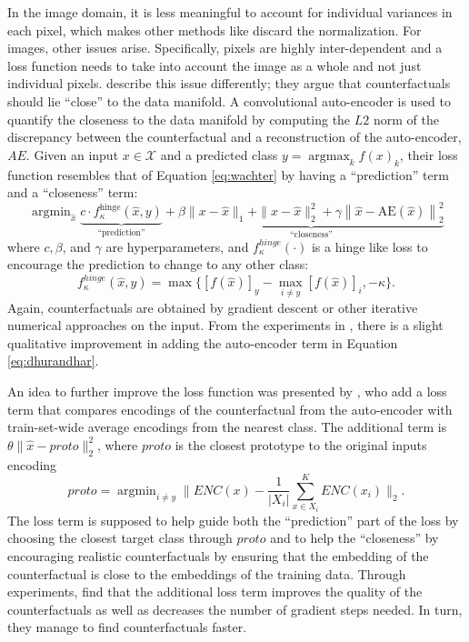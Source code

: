 \documentclass[11pt,a4paper,twoside,openright,final]{memoir}
\DeclareMathOperator*{\argmax}{\arg\max}
\DeclareMathOperator*{\argmin}{\arg\min}
\begin{document}
In the image domain, it is less meaningful to account for individual variances in each pixel, which makes other methods like \cite{Dhurandhar2018} discard the normalization.
For images, other issues arise.
Specifically, pixels are highly inter-dependent and a loss function needs to take into account the image as a whole and not just individual pixels. 
\citet{Dhurandhar2018} describe this issue differently;
they argue that counterfactuals should lie ``close'' to the data manifold.
A convolutional auto-encoder is used to quantify the closeness to the data manifold by computing the $L2$ norm of the discrepancy between the counterfactual and a reconstruction of the auto-encoder, $AE$.
Given an input $x\in \mathcal{X}$ and a predicted class $y = \argmax_k f(x)_k$, their loss function resembles that of Equation \eqref{eq:wachter} by having a ``prediction'' term and a ``closeness'' term:
\begin{equation}\label{eq:dhurandhar}
    \argmin_{\hat x} 
    \underbrace{ c \cdot f_{\kappa}^{\text{hinge}}\left(\hat x, y\right)}_{\text{``prediction''}}
    +
    \underbrace{\beta\|x-\hat x\|_1+\|x-\hat x\|_{2}^{2}+\gamma\left\|\hat x-\mathrm{AE}\left(\hat x \right)\right\|_{2}^{2}}_{\text{``closeness''}}
\end{equation}
where $c, \beta$, and $\gamma$ are hyperparameters, and $f_{\kappa}^{hinge} (\cdot)$ is a hinge like loss to encourage the prediction to change to any other class:
\begin{equation}
    f_{\kappa}^{hinge} (\hat x, y) = \max \{ \left[ f(\hat x)\right]_y - \max_{i\neq y}\left[ f(\hat x) \right]_i, -\kappa \}.
\end{equation}
Again, counterfactuals are obtained by gradient descent or other iterative numerical approaches on the input.
From the experiments in \cite{Dhurandhar2018}, there is a slight qualitative improvement in adding the auto-encoder term in Equation \eqref{eq:dhurandhar}. 

An idea to further improve the loss function was presented by \citet{VanLooveren2019}, who add a loss term that compares encodings of the counterfactual from the auto-encoder with train-set-wide average encodings from the nearest class. 
The additional term is $\theta \| \hat x - proto \|_2^2$, where $proto$ is the closest prototype to the original inputs encoding
\begin{equation}\label{eq:prototype}
    proto = \argmin_{i \neq y} \| ENC(x) - \frac{1}{|X_i|}\sum_{x\in X_i}^K ENC(x_i)\|_2.
\end{equation}
The loss term is supposed to help guide both the ``prediction'' part of the loss by choosing the closest target class through $proto$ and to help the ``closeness'' by encouraging realistic counterfactuals by ensuring that the embedding of the counterfactual is close to the embeddings of the training data.
Through experiments, \citet{VanLooveren2019} find that the additional loss term improves the quality of the counterfactuals as well as decreases the number of gradient steps needed.
In turn, they manage to find counterfactuals faster. 
\end{document}
